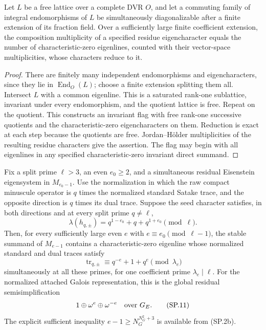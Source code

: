 \begin{lemma}
Let $L$ be a free lattice over a complete DVR $O$, and
let a commuting family of integral endomorphisms of $L$
be simultaneously diagonalizable after a finite extension
of its fraction field. Over a sufficiently large finite
coefficient extension, the composition multiplicity of a
specified residue eigencharacter equals the number of
characteristic-zero eigenlines, counted with their vector-space
multiplicities, whose characters reduce to it.
\end{lemma}

\begin{proof}
There are finitely many independent endomorphisms and
eigencharacters, since they lie in $\operatorname{End}_O(L)$;
choose a finite extension splitting them all. Intersect $L$
with a common eigenline. This is a saturated rank-one
sublattice, invariant under every endomorphism, and the
quotient lattice is free. Repeat on the quotient. This
constructs an invariant flag with free rank-one successive
quotients and the characteristic-zero eigencharacters on
them. Reduction is exact at each step because the
quotients are free. Jordan--H\"older multiplicities of the
resulting residue characters give the assertion. The
flag may begin with all eigenlines in any specified
characteristic-zero invariant direct summand.
\end{proof}

\begin{theorem}
Fix a split prime $\ell>3$, an even $e_0\geq2$, and a
simultaneous residual Eisenstein eigensystem in $M_{e_0-1}$.
Use the normalization in which the raw compact minuscule
operator is $q$ times the normalized standard Satake
trace, and the opposite direction is $q$ times its dual
trace. Suppose the seed character satisfies, in both
directions and at every split prime $q\ne\ell$,
\[
                 \lambda(h_{q,\pm})
                       =q^{1-e_0}+q+q^{1+e_0}\pmod\ell.
                                                               \tag{SP.9}
\]
Then, for every sufficiently large even $e$ with
$e\equiv e_0\pmod{\ell-1}$, the stable summand of
$M_{e-1}$ contains a characteristic-zero eigenline
whose normalized standard and dual traces satisfy
\[
                \operatorname{tr}_{q,\pm}
                   \equiv q^{-e}+1+q^e\pmod\lambda_e
                                                               \tag{SP.10}
\]
simultaneously at all these primes, for one coefficient
prime $\lambda_e\mid\ell$.
For the normalized attached Galois representation, this
is the global residual semisimplification
\[
                     1\oplus\omega^e\oplus\omega^{-e}
                              \quad\hbox{over }G_E.
                                                               \tag{SP.11}
\]
The explicit sufficient inequality
$e-1\geq N_G^{N_G^2+3}$ is available from (SP.2b).
\end{theorem}

